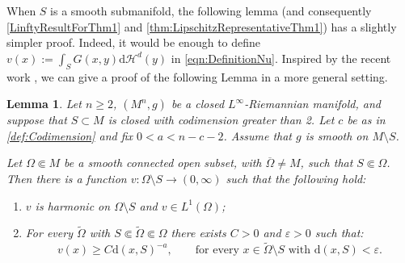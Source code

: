 \documentclass[12pt,a4paper,reqno]{amsart}
\newtheorem{lemma}[theorem]{Lemma}
\renewcommand{\geq}{\geqslant}
\renewcommand{\tilde}{\widetilde}
\begin{document}
 When $S$ is a smooth submanifold, the following lemma (and consequently \cref{LinftyResultForThm1} and \cref{thm:LipschitzRepresentativeThm1}) has a slightly simpler proof. Indeed, it would be enough to define $v(x):=\int_S G(x,y)\mathrm{d}\mathcal{H}^d(y)$ in \eqref{eqn:DefinitionNu}. Inspired by the recent work \cite[Proposition 3.2]{WWX26},  we can give a proof of the following Lemma in a more general setting.
 \begin{lemma}\label{lem:ConstructionvLinfty}
     Let $n\geq 2$, $(M^n,g)$ be a closed $L^\infty$-Riemannian manifold, and suppose that $S\subset M$ is closed with codimension greater than 2. Let $c$ be as in \cref{def:Codimension} and fix $0<a<n-c-2$. Assume that $g$ is smooth on $M\setminus S$.
     
     Let $\Omega\Subset M$ be a smooth connected open subset, with $\overline{\Omega}\neq M$, such that $S\Subset \Omega$. Then there is a function $v:\Omega\setminus S\to (0,\infty)$ such that the following hold:
     \begin{enumerate}
         \item $v$ is harmonic on $\Omega\setminus S$ and $v\in L^1(\Omega)$;
         \item For every $\tilde\Omega$ with $S\Subset \widetilde\Omega\Subset\Omega$ there exists $C>0$ and $\varepsilon>0$ such that:
         \begin{equation}\label{eqn:Asymptoticsv}
        v(x)\geq C\mathrm{d}(x,S)^{-a}, \qquad \text{for every $x\in \widetilde\Omega\setminus S$ with $\mathrm{d}(x,S)<\varepsilon$.}
         \end{equation}
     \end{enumerate}
 \end{lemma}
\end{document}
